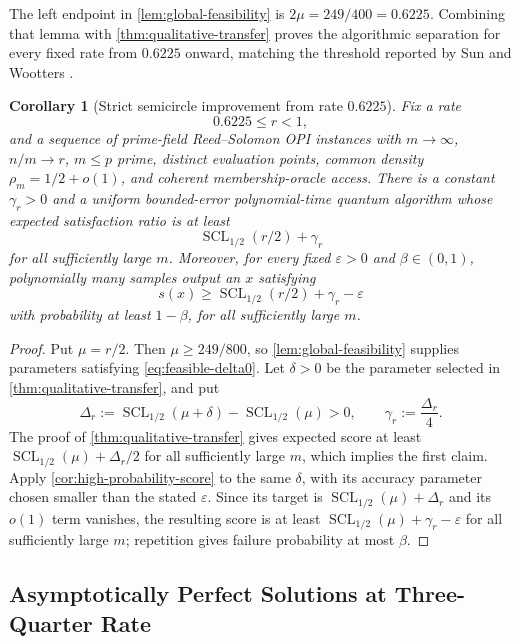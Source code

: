 \documentclass[11pt,letterpaper]{article}
\newtheorem{corollary}[theorem]{Corollary}
\theoremstyle{definition}
\newcommand{\SCL}{\operatorname{SCL}}
\begin{document}
The left endpoint in \cref{lem:global-feasibility} is $2\mu=249/400=0.6225$.  Combining that lemma with \cref{thm:qualitative-transfer} proves the algorithmic separation for every fixed rate from $0.6225$ onward, matching the threshold reported by Sun and Wootters \cite{SunWootters2026}.

\begin{corollary}[Strict semicircle improvement from rate $0.6225$]
\label{cor:rate-06225}
Fix a rate
\begin{equation}
   0.6225\le r<1,
\end{equation}
and a sequence of prime-field Reed--Solomon OPI instances with $m\to\infty$, $n/m\to r$, $m\le p$ prime, distinct evaluation points, common density $\rho_m=1/2+o(1)$, and coherent membership-oracle access.  There is a constant $\gamma_r>0$ and a uniform bounded-error polynomial-time quantum algorithm whose expected satisfaction ratio is at least
\begin{equation}
   \SCL_{1/2}(r/2)+\gamma_r
\end{equation}
for all sufficiently large $m$.  Moreover, for every fixed $\varepsilon>0$ and $\beta\in(0,1)$, polynomially many samples output an $x$ satisfying
\begin{equation}
   s(x)\ge \SCL_{1/2}(r/2)+\gamma_r-\varepsilon
\end{equation}
with probability at least $1-\beta$, for all sufficiently large $m$.
\end{corollary}

\begin{proof}
Put $\mu=r/2$.  Then $\mu\ge249/800$, so \cref{lem:global-feasibility} supplies parameters satisfying \cref{eq:feasible-delta0}.  Let $\delta>0$ be the parameter selected in \cref{thm:qualitative-transfer}, and put
\[
   \Delta_r:=\SCL_{1/2}(\mu+\delta)-\SCL_{1/2}(\mu)>0,
   \qquad \gamma_r:=\frac{\Delta_r}{4}.
\]
The proof of \cref{thm:qualitative-transfer} gives expected score at least $\SCL_{1/2}(\mu)+\Delta_r/2$ for all sufficiently large $m$, which implies the first claim.  Apply \cref{cor:high-probability-score} to the same $\delta$, with its accuracy parameter chosen smaller than the stated $\varepsilon$.  Since its target is $\SCL_{1/2}(\mu)+\Delta_r$ and its $o(1)$ term vanishes, the resulting score is at least $\SCL_{1/2}(\mu)+\gamma_r-\varepsilon$ for all sufficiently large $m$; repetition gives failure probability at most $\beta$.
\end{proof}

\subsection{Asymptotically Perfect Solutions at Three-Quarter Rate}
\end{document}

